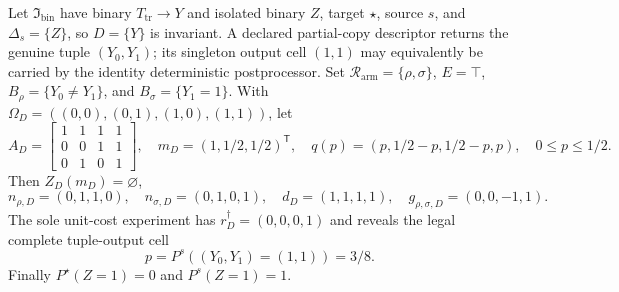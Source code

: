 Let \(\mathfrak I_{\mathrm{bin}}\) have binary \(T_{\mathrm{tr}}\to Y\) and isolated binary \(Z\), target \(\star\), source \(s\), and \(\Delta_s=\{Z\}\), so \(D=\{Y\}\) is invariant.  A declared partial-copy descriptor returns the genuine tuple \((Y_0,Y_1)\); its singleton output cell \((1,1)\) may equivalently be carried by the identity deterministic postprocessor.  Set \(\mathcal R_{\mathrm{arm}}=\{\rho,\sigma\}\), \(E=\top\), \(B_\rho=\{Y_0\ne Y_1\}\), and \(B_\sigma=\{Y_1=1\}\).  With \(\Omega_D=((0,0),(0,1),(1,0),(1,1))\), let
\[
A_D=\begin{bmatrix}1&1&1&1\\0&0&1&1\\0&1&0&1\end{bmatrix},
\quad m_D=(1,1/2,1/2)^{\mathsf T},
\quad q(p)=(p,1/2-p,1/2-p,p),\quad0\leq p\leq1/2.
\]
Then \(Z_D(m_D)=\varnothing\),
\[
n_{\rho,D}=(0,1,1,0),\quad n_{\sigma,D}=(0,1,0,1),
\quad d_D=(1,1,1,1),\quad g_{\rho,\sigma,D}=(0,0,-1,1).
\]
The sole unit-cost experiment has \(r_D^\dagger=(0,0,0,1)\) and reveals the legal complete tuple-output cell
\[
p=P^s((Y_0,Y_1)=(1,1))=3/8.
\]
Finally \(P^\star(Z=1)=0\) and \(P^s(Z=1)=1\).